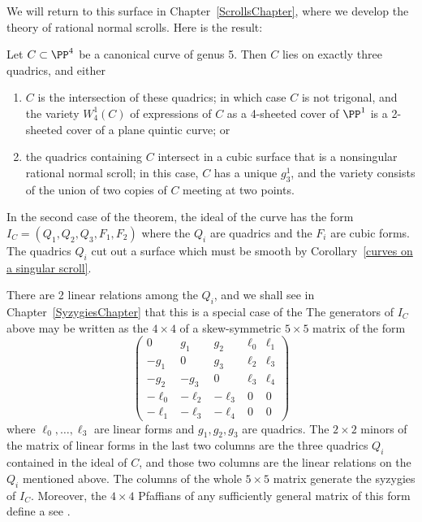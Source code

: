 We will return to this surface in Chapter~\ref{ScrollsChapter},
where we develop the theory of rational normal scrolls.
Here is the result:

\begin{theorem}
Let $C \subset \PP^4$ be a canonical curve of genus 5.
Then $C$ lies on exactly three quadrics, and either
\begin{enumerate}
\item $C$ is the intersection of these quadrics; in which case $C$ is
  not trigonal, and the variety $W^1_4(C)$ of expressions of $C$ as a
  4-sheeted cover of $\PP^1$ is a 2-sheeted cover of a plane quintic
  curve; or
\item the quadrics containing $C$ intersect in a cubic surface that is
a nonsingular rational normal scroll; in this case, $C$ has a unique
$g^1_3$, and the variety
consists of the union of two
copies of $C$ meeting at two points.
\unif
\end{enumerate}
\end{theorem}

\begin{fact}
In the second case of the theorem, the ideal of the curve has the form $I_C = (Q_1, Q_2, Q_3, F_1, F_2)$
where the $Q_i$ are quadrics and the $F_i$ are cubic forms.
The quadrics $Q_i$ cut out a surface
%
which
must be smooth by Corollary~\ref{curves on a singular scroll}.

There are 2 linear relations among the
$Q_i$, and we shall see in Chapter~\ref{SyzygiesChapter}
that this is a special case of the
%
The generators of $I_C$ above may be written as the $4\times 4$
%
of a skew-symmetric $5\times 5$ matrix of the form
$$
\begin{pmatrix}
0&g_1&g_2&\ell_0&\ell_1\\
-g_1&0&g_3&\ell_2&\ell_3\\
-g_2&-g_3&0 &\ell_3&\ell_4\\
-\ell_0&-\ell_2&-\ell_3&0&0\\
-\ell_1&-\ell_3&-\ell_4&0&0
\end{pmatrix}
$$
where $\ell_0,\dots,\ell_3$ are linear forms and $g_1, g_2, g_3$ are quadrics. The
 $2\times 2$
minors of the matrix of linear forms in the last two columns are the three quadrics $Q_i$ contained in the ideal
of $C$, and those two columns are the linear relations on the $Q_i$ mentioned above.
The columns of the whole $5\times 5$ matrix generate the syzygies of $I_C$. Moreover, the
$4\times 4$ Pfaffians of any sufficiently general matrix of this form define a
%
see \cite{MR453723}.
\end{fact}


